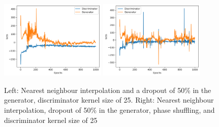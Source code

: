 \begin{figure}[t]
\centering
\includegraphics[width=0.45\textwidth]{loss_plots/wpgan_flute_hist_nearest_d50_0803.png}
\includegraphics[width=0.45\textwidth]{loss_plots/wpgan_flute_hist_nearest_ps_d50_0803.png}
\caption{Left: Nearest neighbour interpolation and a dropout of 50\% in the generator, discriminator kernel size of 25. Right: Nearest neighbour interpolation, dropout of 50\% in the generator, phase shuffling, and discriminator kernel size of 25}
\end{figure}
